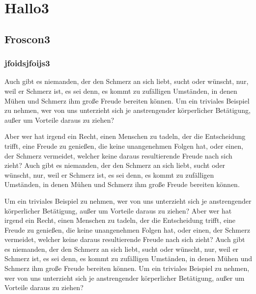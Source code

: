 \documentclass[12pt]{scrreprt}
\begin{document}
\section{Hallo3}

\subsection{Froscon3}

\subsubsection{jfoidsjfoijs3}

Auch gibt es niemanden, der den Schmerz an sich liebt, sucht oder wünscht, nur, weil er Schmerz ist, es sei denn, es kommt zu zufälligen Umständen, in denen Mühen und Schmerz ihm große Freude bereiten können. Um ein triviales Beispiel zu nehmen, wer von uns unterzieht sich je anstrengender körperlicher Betätigung, außer um Vorteile daraus zu ziehen?

Aber wer hat irgend ein Recht, einen Menschen zu tadeln, der die Entscheidung trifft, eine Freude zu genießen, die keine unangenehmen Folgen hat, oder einen, der Schmerz vermeidet, welcher keine daraus resultierende Freude nach sich zieht? Auch gibt es niemanden, der den Schmerz an sich liebt, sucht oder wünscht, nur, weil er Schmerz ist, es sei denn, es kommt zu zufälligen Umständen, in denen Mühen und Schmerz ihm große Freude bereiten können.

Um ein triviales Beispiel zu nehmen, wer von uns unterzieht sich je anstrengender körperlicher Betätigung, außer um Vorteile daraus zu ziehen? Aber wer hat irgend ein Recht, einen Menschen zu tadeln, der die Entscheidung trifft, eine Freude zu genießen, die keine unangenehmen Folgen hat, oder einen, der Schmerz vermeidet, welcher keine daraus resultierende Freude nach sich zieht? Auch gibt es niemanden, der den Schmerz an sich liebt, sucht oder wünscht, nur, weil er Schmerz ist, es sei denn, es kommt zu zufälligen Umständen, in denen Mühen und Schmerz ihm große Freude bereiten können. Um ein triviales Beispiel zu nehmen, wer von uns unterzieht sich je anstrengender körperlicher Betätigung, außer um Vorteile daraus zu ziehen?
\end{document}
